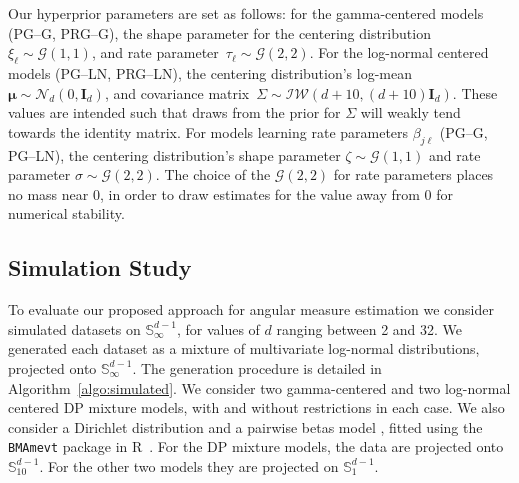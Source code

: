 Our hyperprior parameters are set as follows: for the gamma-centered models (PG--G, PRG--G), 
    the shape parameter for the centering 
    distribution~$\xi_{\ell}\sim \mathcal{G}\left(1,1\right)$, and
    rate parameter~$\tau_{\ell}\sim\mathcal{G}\left(2,2\right)$.
    For the log-normal centered models (PG--LN, PRG--LN), the centering distribution's
    log-mean $\bm{\mu}\sim\mathcal{N}_d\left(0,\bm{I}_d\right)$, and covariance 
    matrix~$\Sigma\sim\mathcal{IW}\left(d + 10, (d+10)\bm{I}_{d}\right)$.  These values are 
    intended such that draws from the prior for $\Sigma$ will weakly tend towards the 
    identity matrix.
    For models learning rate parameters $\beta_{j\ell}$ (PG--G, PG--LN), the centering
    distribution's shape parameter $\zeta\sim\mathcal{G}\left(1,1\right)$ and rate parameter
    $\sigma\sim\mathcal{G}\left(2,2\right)$.  The choice of the $\mathcal{G}(2,2)$ for rate
    parameters places no mass near 0, in order to draw estimates for the value away from 
    0 for numerical stability.

\subsection{Simulation Study\label{subsec:simulated}}
To evaluate our proposed approach for angular measure estimation 
    we consider simulated datasets on $\mathbb{S}_{\infty}^{d-1}$,
    for values of $d$ ranging between 2 and 32.  We generated each
    dataset as a mixture of multivariate log-normal distributions,
    projected onto $\mathbb{S}_{\infty}^{d-1}$. The generation 
    procedure is detailed in Algorithm~\ref{algo:simulated}.  We consider two gamma-centered
    and two log-normal centered DP mixture models, with and without restrictions in each
    case. We also consider a Dirichlet distribution and 
    a pairwise betas model \citep{COOLEY2010}, fitted using the \verb|BMAmevt| 
    package in R~\citep{BMAmevt}. For the DP mixture
    models, the data are projected onto $\mathbb{S}_{10}^{d-1}$. For the other
    two models they are projected on $\mathbb{S}_1^{d-1}$.

